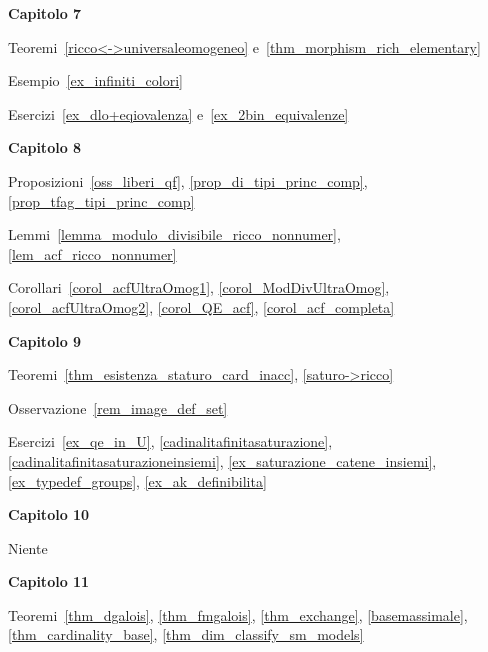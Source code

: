 \textbf{Capitolo 7}

Teoremi~\ref{ricco<->universaleomogeneo} e~\ref{thm_morphism_rich_elementary}

Esempio~\ref{ex_infiniti_colori} 

Esercizi~\ref{ex_dlo+eqiovalenza} e~\ref{ex_2bin_equivalenze}

\textbf{Capitolo 8}

Proposizioni~\ref{oss_liberi_qf}, \ref{prop_di_tipi_princ_comp}, \ref{prop_tfag_tipi_princ_comp}

Lemmi~\ref{lemma_modulo_divisibile_ricco_nonnumer}, \ref{lem_acf_ricco_nonnumer}

Corollari~\ref{corol_acfUltraOmog1}, \ref{corol_ModDivUltraOmog}, \ref{corol_acfUltraOmog2}, \ref{corol_QE_acf}, \ref{corol_acf_completa}

\textbf{Capitolo 9}

Teoremi~\ref{thm_esistenza_staturo_card_inacc}, \ref{saturo->ricco}

Osservazione~\ref{rem_image_def_set}

Esercizi~\ref{ex_qe_in_U}, \ref{cadinalitafinitasaturazione},  \ref{cadinalitafinitasaturazioneinsiemi},  \ref{ex_saturazione_catene_insiemi}, \ref{ex_typedef_groups}, \ref{ex_ak_definibilita}

\textbf{Capitolo 10}

Niente

\textbf{Capitolo 11}

Teoremi~\ref{thm_dgalois}, \ref{thm_fmgalois}, \ref{thm_exchange}, \ref{basemassimale}, \ref{thm_cardinality_base}, \ref{thm_dim_classify_sm_models}